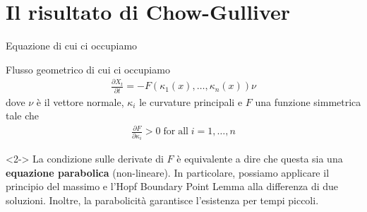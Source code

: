 \section{Il risultato di Chow-Gulliver}


\begin{frame}{Equazione di cui ci occupiamo}{}
	\begin{block}{Flusso geometrico di cui ci occupiamo}
		\begin{align*}
			\frac{\partial X_t}{\partial t} = - F(\kappa_1(x), \dots , \kappa_n(x)) \nu
		\end{align*}
		dove $\nu$ è il vettore normale, $\kappa_i$ le curvature principali e $F$ una funzione simmetrica tale che 
		\begin{align*}
			\frac{\partial F}{\partial \kappa_i} > 0 \mathrm{\; for \; all } \; i=1,\dots, n
		\end{align*}
	\end{block}
	\begin{block}{}<2->
		La condizione sulle derivate di $F$ è equivalente a dire che questa sia una \textbf{equazione parabolica} (non-lineare). In particolare, possiamo applicare il principio del massimo e l'Hopf Boundary Point Lemma alla differenza di due soluzioni. Inoltre, la parabolicità garantisce l'esistenza per tempi piccoli.
	\end{block}
\end{frame}



